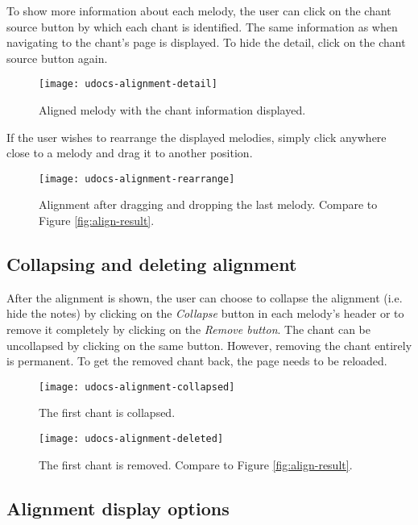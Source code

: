 To show more information about each melody, the user can click on the chant source button by which each chant is identified. The same information as when navigating
to the chant's page is displayed. To hide the detail, click on the chant source button again.

\begin{figure}[h]
\centering
\texttt{[image: udocs-alignment-detail]}
\caption{Aligned melody with the chant information displayed.}
\label{fig:align-detail}
\end{figure}

If the user wishes to rearrange the displayed melodies, simply click anywhere close to a melody and drag it to another position.

\begin{figure}[h]
\centering
\texttt{[image: udocs-alignment-rearrange]}
\caption{Alignment after dragging and dropping the last melody. Compare to Figure \ref{fig:align-result}.}
\label{fig:align-rearrange}
\end{figure}

\subsection{Collapsing and deleting alignment}

After the alignment is shown, the user can choose to collapse the alignment (i.e. hide the notes) by clicking on the \emph{Collapse} button
in each melody's header or to remove it completely by clicking on the \emph{Remove button}. The chant can be uncollapsed by clicking
on the same button. However, removing the chant entirely is permanent. To get the removed chant back, the page needs to be reloaded.

\begin{figure}[h]
\centering
\texttt{[image: udocs-alignment-collapsed]}
\caption{The first chant is collapsed.}
\label{fig:align-collapsed}
\end{figure}

\begin{figure}[h]
\centering
\texttt{[image: udocs-alignment-deleted]}
\caption{The first chant is removed. Compare to Figure \ref{fig:align-result}.}
\label{fig:align-removed}
\end{figure}

\subsection{Alignment display options}

